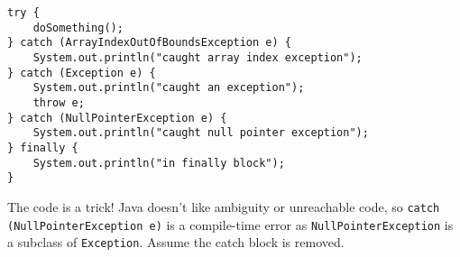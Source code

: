 \begin{blocksection}
\question

\begin{lstlisting}
try {
    doSomething();
} catch (ArrayIndexOutOfBoundsException e) {
    System.out.println("caught array index exception");
} catch (Exception e) {
    System.out.println("caught an exception");
    throw e;
} catch (NullPointerException e) {
    System.out.println("caught null pointer exception");
} finally {
    System.out.println("in finally block");
}
\end{lstlisting}

\begin{solution}
The code is a trick! Java doesn't like ambiguity or unreachable code, so
\lstinline$catch (NullPointerException e)$ is a compile-time error as
\lstinline$NullPointerException$ is a subclass of \lstinline$Exception$. Assume
the catch block is removed.
\end{solution}



\end{blocksection}
